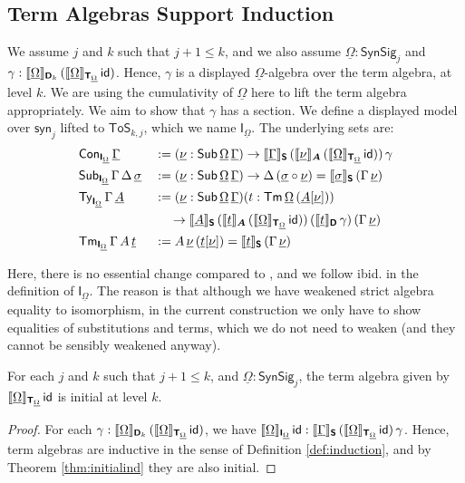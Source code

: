 \documentclass[sigplan,review,anonymous]{acmart}\settopmatter{printfolios=true,printccs=false,printacmref=false}
\newcommand{\ToS}{\mathsf{ToS}}
\newcommand{\syn}{\mathsf{syn}}
\newcommand{\SynSig}{\mathsf{SynSig}}
\newcommand{\bA}{\boldsymbol{A}}
\newcommand{\bT}{\boldsymbol{\mathsf{T}}}
\newcommand{\bS}{\boldsymbol{\mathsf{S}}}
\newcommand{\bD}{\boldsymbol{\mathsf{D}}}
\newcommand{\bI}{\boldsymbol{\mathsf{I}}}
\newcommand{\ul}[1]{\underline{#1}}
\newcommand{\ulGamma}{\ul{\Gamma}}
\newcommand{\ulOmega}{\ul{\Omega}}
\newcommand{\ulsigma}{\ul{\sigma}}
\newcommand{\ulnu}{\ul{\nu}}
\newcommand{\ult}{\ul{t}}
\newcommand{\ulA}{\ul{A}}
\newcommand{\llb}{\llbracket}
\newcommand{\rrb}{\rrbracket}
\begin{document}
\subsection{Term Algebras Support Induction}

\begin{definition} We assume $j$ and $k$ such that $j + 1 \leq k$, and we also assume
$\ulOmega : \SynSig_j$ and $\gamma :
\llb\ulOmega\rrb_{\bD_k}\,(\llb\ulOmega\rrb_{\bT_{\ulOmega}}\,\id)$.  Hence, $\gamma$ is
a displayed $\ulOmega$-algebra over the term algebra, at level $k$. We are using
the cumulativity of $\ulOmega$ here to lift the term algebra appropriately.
We aim to show that $\gamma$ has a section. We define a displayed model over $\syn_j$ lifted
to $\ToS_{k, j}$, which we name $\bI_{\ulOmega}$. The underlying sets are:
\begin{alignat*}{3}
  & \Con_{\bI_{\ulOmega}}\,\ulGamma &&:= (\ulnu : \Sub\,\ulOmega\,\ulGamma)\ra
  \llb\ulGamma\rrb_{\bS}\,(\llb\ulnu\rrb_{\bA}\,(\llb\ulOmega\rrb_{\bT_{\ulOmega}}\,\id))\,\gamma\\
  & \Sub_{\bI_{\ulOmega}}\,\Gamma\,\Delta\,\ulsigma && := (\ulnu : \Sub\,\ulOmega\,\ulGamma)\ra
    \Delta\,(\ulsigma\circ\ulnu) = \llb\ulsigma\rrb_{\bS}\,(\Gamma\,\ulnu)\\
  & \Ty_{\bI_{\ulOmega}}\,\Gamma\,\ulA &&:=
  (\ulnu : \Sub\,\ulOmega\,\ulGamma)(t : \Tm\,\ulOmega\,(\ulA[\ulnu]))\\
  & && \hspace{1.2em}\ra
  \llb\ulA\rrb_{\bS}\,(\llb\ult\rrb_{\bA}\,(\llb\ulOmega\rrb_{\bT_{\ulOmega}}\,\id))\,
  (\llb\ult\rrb_{\bD}\,\gamma)\,(\Gamma\,\ulnu)\\
  & \Tm_{\bI_{\ulOmega}}\,\Gamma\,A\,\ult &&:= A\,\ulnu\,(\ult[\ulnu]) = \llb\ult\rrb_{\bS}\,(\Gamma\,\ulnu)
\end{alignat*}

Here, there is no essential change compared to \cite{kaposi2019constructing},
and we follow ibid. in the definition of $\bI_{\ulOmega}$. The reason is that although we
have weakened strict algebra equality to isomorphism, in the current
construction we only have to show equalities of substitutions and terms, which
we do not need to weaken (and they cannot be sensibly weakened anyway).
\end{definition}

\begin{theorem} For each $j$ and $k$ such that $j + 1 \leq k$, and $\ulOmega : \SynSig_j$, the term algebra given by $\llb\ulOmega\rrb_{\bT_{\ulOmega}}\,\id$ is initial at level $k$.
\end{theorem}
\begin{proof}
For each $\gamma :
\llb\ulOmega\rrb_{\bD_k}\,(\llb\ulOmega\rrb_{\bT_{\ulOmega}}\,\id)$, we have
$\llb\ulOmega\rrb_{\bI_{\ulOmega}}\,\id :
\llb\ulGamma\rrb_{\bS}\,(\llb\ulOmega\rrb_{\bT_{\ulOmega}}\,\id)\,\gamma$. Hence,
term algebras are inductive in the sense of Definition \ref{def:induction}, and
by Theorem \ref{thm:initialind} they are also initial.
\end{proof}
\end{document}
